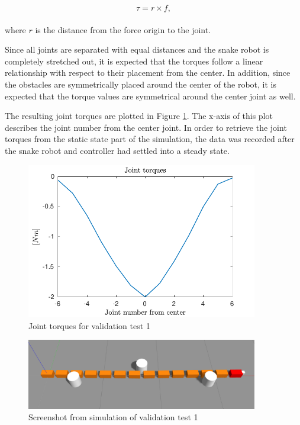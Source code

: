 \begin{equation}
    \tau = r\times f,
\end{equation}
\\
where $r$ is the distance from the force origin to the joint.

Since all joints are separated with equal distances and the snake robot is completely stretched out, it is expected that the torques follow a linear relationship with respect to their placement from the center. In addition, since the obstacles are symmetrically placed around the center of the robot, it is expected that the torque values are symmetrical around the center joint as well.

The resulting joint torques are plotted in Figure \ref{fig:validation1}. The x-axis of this plot describes the joint number from the center joint. In order to retrieve the joint torques from the static state part of the simulation, the data was recorded after the snake robot and controller had settled into a steady state.

\begin{figure}
    \centering
    \includegraphics[width=0.9\textwidth]{figures/experiments/validation1.pdf}
    \caption{Joint torques for validation test 1}
    \label{fig:validation1}
\end{figure}

\begin{figure}
    \centering
    \includegraphics[width=0.9\textwidth]{figures/experiments/exp_valid1_gazebo.png}
    \caption{Screenshot from simulation of validation test 1}
    \label{fig:valid1_gazebo}
\end{figure}

